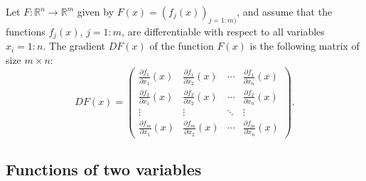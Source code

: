 \begin{definition}
    Let $ F : \mathbb{R}^n \rightarrow \mathbb{R}^m $ given by
        $ F(x) = (f_j(x))_{j=1:m)} $, and assume that the functions $ f_j(x) $,
        $ j = 1:m $, are differentiable with respect to all variables
        $ x_i = 1:n $.
    The gradient $ D F(x) $ of the function $ F(x) $ is the following matrix of
        size $ m \times n $:
    \begin{equation}
        D F(x) =
        \begin{pmatrix}
            \frac{\partial f_1}{\partial x_1} (x) &
                \frac{\partial f_1}{\partial x_2} (x) & \cdots &
                \frac{\partial f_1}{\partial x_n} (x) \\
            \frac{\partial f_2}{\partial x_1} (x) &
                \frac{\partial f_2}{\partial x_2} (x) & \cdots &
                \frac{\partial f_2}{\partial x_n} (x) \\
            \vdots & \vdots & \ddots & \vdots \\
            \frac{\partial f_m}{\partial x_1} (x) &
                \frac{\partial f_m}{\partial x_2} (x) & \cdots &
                \frac{\partial f_m}{\partial x_n} (x)
        \end{pmatrix}.
        \label{eq:definition:partial-derivative-vector-valued-function-gradient}
    \end{equation}
\end{definition}

\subsection{Functions of two variables}
